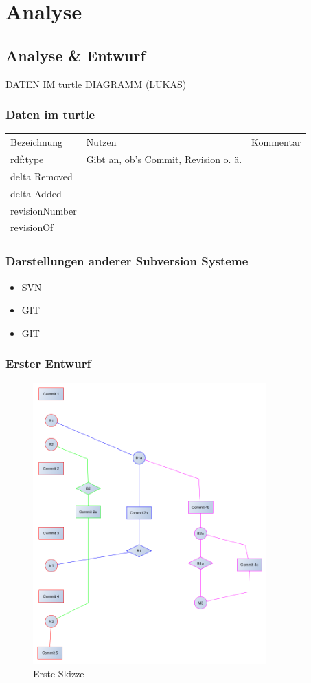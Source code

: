 \documentclass[color, ddc]{tudscrreprt}
\begin{document}
\chapter{Analyse}

\section{Analyse \& Entwurf}

DATEN IM turtle DIAGRAMM (LUKAS)
\subsection{Daten im turtle}
\def\arraystretch{1.5}
\begin{tabular}{l l c}
Bezeichnung & Nutzen & Kommentar\\
rdf:type & Gibt an, ob's Commit, Revision o. ä. & \\
delta Removed & & \\
delta Added & & \\
revisionNumber & & \\
revisionOf & & \\

\end{tabular}

\subsection{Darstellungen anderer Subversion Systeme}
\begin{itemize}
\item SVN \cite{url:svn-gource}
\item GIT \cite{url:git}
\item GIT \cite{url:gitready}
\end{itemize}

\subsection{Erster Entwurf}

\begin{figure}[ht!]
\centering
\includegraphics[width=90mm]{Skizzen/2014-12-12 VisualisierungsSkizze.png}
\caption{Erste Skizze}
\end{figure}
\end{document}
